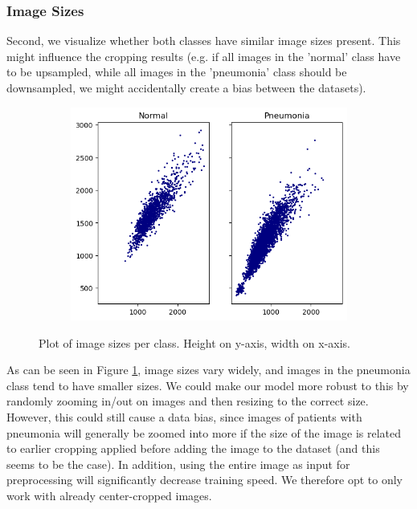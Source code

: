 \subsubsection{Image Sizes}
Second, we visualize whether both classes have similar image sizes present. This might influence the cropping results (e.g. if all images in the 'normal' class have to be upsampled, while all images in the 'pneumonia' class should be downsampled, we might accidentally create a bias between the datasets).

\begin{figure}[H]
    \centering
    \begin{subfigure}{0.9\columnwidth}
        \includegraphics[width=1\textwidth]{images/sizes.png}
    \end{subfigure}
    \caption{Plot of image sizes per class. Height on y-axis, width on x-axis.}
    \label{fig:sizes}
\end{figure}

As can be seen in Figure \ref{fig:sizes}, image sizes vary widely, and images in the pneumonia class tend to have smaller sizes. We could make our model more robust to this by randomly zooming in/out on images and then resizing to the correct size. However, this could still cause a data bias, since images of patients with pneumonia will generally be zoomed into more if the size of the image is related to earlier cropping applied before adding the image to the dataset (and this seems to be the case). In addition, using the entire image as input for preprocessing will significantly decrease training speed. We therefore opt to only work with already center-cropped images.

